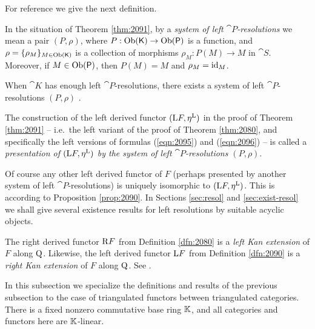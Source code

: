 For reference we give the next definition.  

\begin{dfn} \label{dfn:2095}
In the situation of Theorem \ref{thm:2091}, by a {\em system of left 
$\cat{P}$-resolutions} we mean a pair $(P, \rho)$, where 
$P : \operatorname{Ob}(\operatorname{\mathsf{K}}) \to \operatorname{Ob}(\operatorname{\mathsf{P}})$
is a function, and 
$\rho = \{ \rho_M \}_{M \in \operatorname{Ob}(\operatorname{\mathsf{K}})}$ 
is a collection of morphisms
$\rho_M : P(M) \to M$ in $\cat{S}$.
Moreover, if $M \in \operatorname{Ob}(\operatorname{\mathsf{P}})$, then 
$P(M) = M$ and $\rho_M = \operatorname{id}_M$. 
\end{dfn}

When $\cat{K}$ has enough left $\cat{P}$-resolutions, there exists
a system of left $\cat{P}$-resolutions $(P, \rho)$ .

\begin{dfn} \label{dfn:2331}
The construction of the left derived functor $(\mathrm{L} F, \eta^{\mathrm{L}})$ in 
the proof of Theorem \ref{thm:2091} -- i.e.\ the left variant of the proof of 
Theorem \ref{thm:2080}, and specifically the left versions of formulas 
(\ref{eqn:2095}) and (\ref{eqn:2096}) -- 
is called a {\em presentation of $(\mathrm{L} F, \eta^{\mathrm{L}})$ by the system of 
left $\cat{P}$-resolutions $(P, \rho)$}. 
\end{dfn}

Of course any other left derived functor of $F$ (perhaps presented  
by another system of left $\cat{P}$-resolutions) is uniquely isomorphic to 
$(\mathrm{L} F, \eta^{\mathrm{L}})$. This is according to Proposition 
\ref{prop:2090}. In Sections \ref{sec:resol} and \ref{sec:exist-resol} we shall 
give several existence results for left resolutions by suitable acyclic 
objects. 

\begin{rem} \label{rem:4696}
The right derived functor $\mathrm{R} F$ from Definition \ref{dfn:2080} is a {\em 
left Kan extension} of $F$ along $\operatorname{Q}$. Likewise, the left derived functor 
$\mathrm{L} F$ from Definition \ref{dfn:2090} is a {\em right Kan extension} of 
$F$ along $\operatorname{Q}$. See \cite[Chapter X]{Mac2}.
\end{rem}




 \label{subsec:tri-der-funs}

In this subsection we specialize the definitions and results of the previous 
subsection to the case of triangulated functors between triangulated 
categories. 
There is a fixed nonzero commutative base ring $\mathbb{K}$, and all categories and 
functors here are $\mathbb{K}$-linear. 

